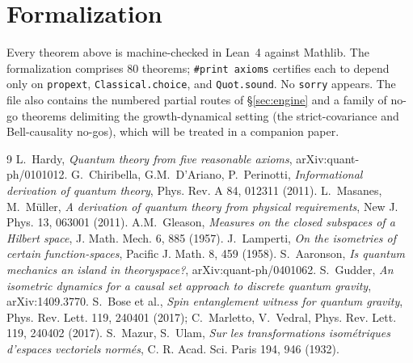 \documentclass[11pt]{article}
\begin{document}
\section{Formalization}\label{sec:lean}

Every theorem above is machine-checked in Lean~4 against Mathlib.  The
formalization comprises 80 theorems; \texttt{\#print axioms} certifies
each to depend only on \texttt{propext}, \texttt{Classical.choice},
and \texttt{Quot.sound}.  No \texttt{sorry} appears.  The file also
contains the numbered partial routes of \S\ref{sec:engine} and a
family of no-go theorems delimiting the growth-dynamical setting (the
strict-covariance and Bell-causality no-gos), which will be treated in
a companion paper.

\begin{thebibliography}{9}
 L.~Hardy, \emph{Quantum theory from five reasonable
axioms}, arXiv:quant-ph/0101012.
 G.~Chiribella, G.M.~D'Ariano, P.~Perinotti,
\emph{Informational derivation of quantum theory}, Phys. Rev. A 84,
012311 (2011).
 L.~Masanes, M.~M\"uller, \emph{A derivation of quantum
theory from physical requirements}, New J. Phys. 13, 063001 (2011).
 A.M.~Gleason, \emph{Measures on the closed subspaces
of a Hilbert space}, J. Math. Mech. 6, 885 (1957).
 J.~Lamperti, \emph{On the isometries of certain
function-spaces}, Pacific J. Math. 8, 459 (1958).
 S.~Aaronson, \emph{Is quantum mechanics an island
in theoryspace?}, arXiv:quant-ph/0401062.
 S.~Gudder, \emph{An isometric dynamics for a causal
set approach to discrete quantum gravity}, arXiv:1409.3770.
 S.~Bose et al., \emph{Spin entanglement witness for
quantum gravity}, Phys. Rev. Lett. 119, 240401 (2017); C.~Marletto,
V.~Vedral, Phys. Rev. Lett. 119, 240402 (2017).
 S.~Mazur, S.~Ulam, \emph{Sur les transformations
isom\'etriques d'espaces vectoriels norm\'es}, C. R. Acad. Sci. Paris
194, 946 (1932).
\end{thebibliography}
\end{document}
